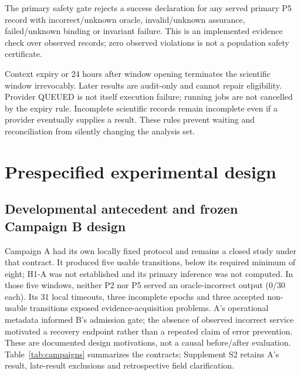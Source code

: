 \documentclass[pdflatex,sn-mathphys-num]{sn-jnl}
\begin{document}
The primary safety gate rejects a success declaration for any served primary P5 record with incorrect/unknown oracle, invalid/unknown assurance, failed/unknown binding or invariant failure. This is an implemented evidence check over observed records; zero observed violations is not a population safety certificate.

Context expiry or 24 hours after window opening terminates the scientific window irrevocably. Later results are audit-only and cannot repair eligibility. Provider QUEUED is not itself execution failure; running jobs are not cancelled by the expiry rule. Incomplete scientific records remain incomplete even if a provider eventually supplies a result. These rules prevent waiting and reconciliation from silently changing the analysis set.

\section{Prespecified experimental design}
\subsection{Developmental antecedent and frozen Campaign B design}
Campaign A had its own locally fixed protocol and remains a closed study under that contract. It produced five usable transitions, below its required minimum of eight; H1-A was not established and its primary inference was not computed. In those five windows, neither P2 nor P5 served an oracle-incorrect output (0/30 each). Its 31 local timeouts, three incomplete epochs and three accepted non-usable transitions exposed evidence-acquisition problems. A's operational metadata informed B's admission gate; the absence of observed incorrect service motivated a recovery endpoint rather than a repeated claim of error prevention. These are documented design motivations, not a causal before/after evaluation. Table~\ref{tab:campaigns} summarizes the contracts; Supplement S2 retains A's result, late-result exclusions and retrospective field clarification.
\end{document}
